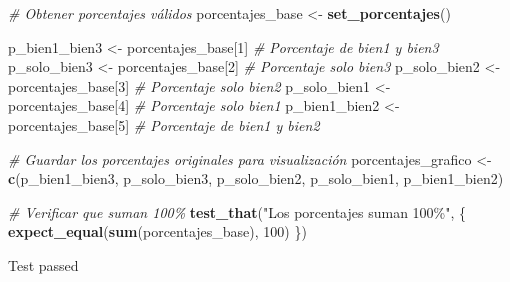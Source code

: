 \documentclass[
]{article}
\newenvironment{Shaded}{\begin{snugshade}}{\end{snugshade}}
\newcommand{\CommentTok}[1]{\textcolor[rgb]{0.56,0.35,0.01}{\textit{#1}}}
\newcommand{\DecValTok}[1]{\textcolor[rgb]{0.00,0.00,0.81}{#1}}
\newcommand{\FunctionTok}[1]{\textcolor[rgb]{0.13,0.29,0.53}{\textbf{#1}}}
\newcommand{\NormalTok}[1]{#1}
\newcommand{\OtherTok}[1]{\textcolor[rgb]{0.56,0.35,0.01}{#1}}
\newcommand{\StringTok}[1]{\textcolor[rgb]{0.31,0.60,0.02}{#1}}
\begin{document}
\begin{Shaded}
\begin{Highlighting}[]
\CommentTok{\# Obtener porcentajes válidos}
\NormalTok{porcentajes\_base }\OtherTok{\textless{}{-}} \FunctionTok{set\_porcentajes}\NormalTok{()}

\NormalTok{p\_bien1\_bien3 }\OtherTok{\textless{}{-}}\NormalTok{ porcentajes\_base[}\DecValTok{1}\NormalTok{]  }\CommentTok{\# Porcentaje de bien1 y bien3}
\NormalTok{p\_solo\_bien3 }\OtherTok{\textless{}{-}}\NormalTok{ porcentajes\_base[}\DecValTok{2}\NormalTok{]   }\CommentTok{\# Porcentaje solo bien3}
\NormalTok{p\_solo\_bien2 }\OtherTok{\textless{}{-}}\NormalTok{ porcentajes\_base[}\DecValTok{3}\NormalTok{]   }\CommentTok{\# Porcentaje solo bien2}
\NormalTok{p\_solo\_bien1 }\OtherTok{\textless{}{-}}\NormalTok{ porcentajes\_base[}\DecValTok{4}\NormalTok{]   }\CommentTok{\# Porcentaje solo bien1}
\NormalTok{p\_bien1\_bien2 }\OtherTok{\textless{}{-}}\NormalTok{ porcentajes\_base[}\DecValTok{5}\NormalTok{]  }\CommentTok{\# Porcentaje de bien1 y bien2}

\CommentTok{\# Guardar los porcentajes originales para visualización}
\NormalTok{porcentajes\_grafico }\OtherTok{\textless{}{-}} \FunctionTok{c}\NormalTok{(p\_bien1\_bien3, p\_solo\_bien3, p\_solo\_bien2, p\_solo\_bien1, p\_bien1\_bien2)}

\CommentTok{\# Verificar que suman 100\%}
\FunctionTok{test\_that}\NormalTok{(}\StringTok{"Los porcentajes suman 100\%"}\NormalTok{, \{}
  \FunctionTok{expect\_equal}\NormalTok{(}\FunctionTok{sum}\NormalTok{(porcentajes\_base), }\DecValTok{100}\NormalTok{)}
\NormalTok{\})}
\end{Highlighting}
\end{Shaded}

Test passed
\end{document}
